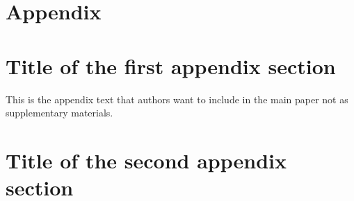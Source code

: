 \documentclass[submit]{smj}
\begin{document}
\appendix
\section*{Appendix}
\section{Title of the first appendix section}
This is the appendix text that authors want to include in the main paper not as supplementary materials.

\section{Title of the second appendix section}


\end{document}
